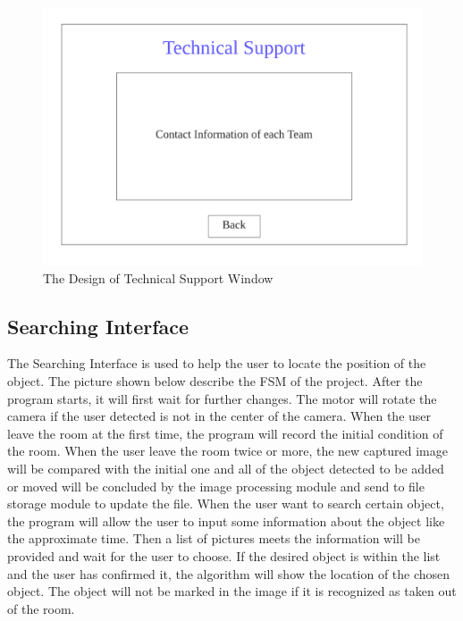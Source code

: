 \documentclass[12pt, titlepage]{article}
\begin{document}
\begin{figure}[H]
    \centering
    \includegraphics[scale=0.8]{Technical.png}
    \caption{The Design of Technical Support Window}
\end{figure}

\subsection{Searching Interface}

The Searching Interface is used to help the user to locate the position of the object. The picture shown below describe the FSM of the project. After the program starts, it will first wait for further changes. The motor will rotate the camera if the user detected is not in the center of the camera. When the user leave the room at the first time, the program will record the initial condition of the room. When the user leave the room twice or more, the new captured image will be compared with the initial one and all of the object detected to be added or moved will be concluded by the image processing module and send to file storage module to update the file. When the user want to search certain object, the program will allow the user to input some information about the object like the approximate time. Then a list of pictures meets the information will be provided and wait for the user to choose. If the desired object is within the list and the user has confirmed it, the algorithm will show the location of the chosen object. The object will not be marked in the image if it is recognized as taken out of the room.
\end{document}
